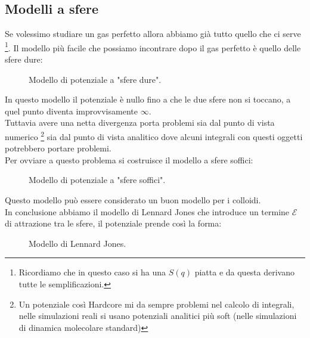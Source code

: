 \subsection{Modelli a sfere}
Se volessimo studiare un gas perfetto allora abbiamo già tutto quello che ci serve \footnote{Ricordiamo che in questo caso si ha una $S(q)$ piatta e da questa derivano tutte le semplificazioni.}. Il modello più facile che possiamo incontrare dopo il gas perfetto è quello delle sfere dure:
\begin{figure}[H]
    \centering
    \caption{Modello di potenziale a "sfere dure".}
    \label{fig:sfere-dure-u}
\end{figure}
\noindent
In questo modello il potenziale è nullo fino a che le due sfere non si toccano, a quel punto diventa improvvisamente $\infty$.\\
Tuttavia avere una netta divergenza porta problemi sia dal punto di vista numerico \footnote{Un potenziale così Hardcore mi da sempre problemi nel calcolo di integrali, nelle simulazioni reali si usano potenziali analitici più soft (nelle simulazioni di dinamica molecolare standard)} sia dal punto di vista analitico dove alcuni integrali con questi oggetti potrebbero portare problemi. \\
Per ovviare a questo problema si costruisce il modello a sfere soffici:
\begin{figure}[H]
    \centering
    \caption{Modello di potenziale a "sfere soffici".}
    \label{fig:sfere-soffici-u}
\end{figure}
\noindent
Questo modello può essere considerato un buon modello per i colloidi.\\
In conclusione abbiamo il modello di Lennard Jones che introduce un termine $\mathcal{E}$ di attrazione tra le sfere, il potenziale prende così la forma:
\begin{figure}[H]
    \centering
    \caption{Modello di Lennard Jones.}
    \label{fig:sfere-lennard-jones}
\end{figure}
\noindent
